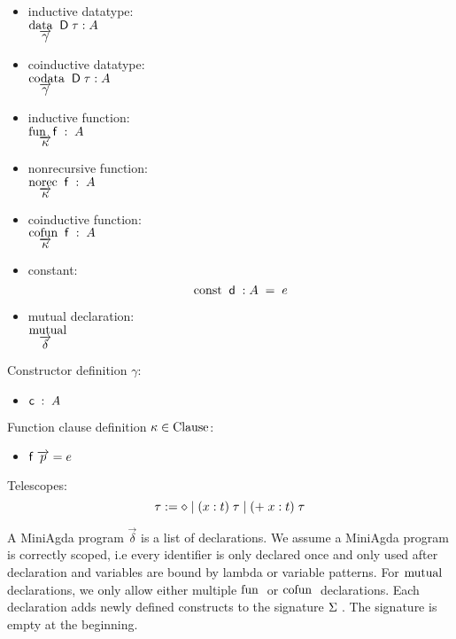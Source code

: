 \begin{itemize}
\item
inductive datatype:\\ 
$\mathrm{data}\; \; \mathsf{D} \; \tau : A $\\ 
$\hspace*{3mm} \overrightarrow{\gamma}$  
\item
coinductive datatype:\\
$\mathrm{codata}\; \; \mathsf{D} \; \tau : A $\\
$\hspace*{3mm} \overrightarrow{\gamma}$  
\item
inductive function:\\
$\mathrm{fun}\; \; \mathsf{f} \; : \; A$\\
$\hspace*{3mm} \overrightarrow{\kappa}$
\item
nonrecursive function:\\
$\mathrm{norec}\; \; \mathsf{f} \; : \; A $\\ 
$\hspace*{3mm} \overrightarrow{\kappa}$
\item
coinductive function:\\
$\mathrm{cofun}\; \; \mathsf{f} \; : \; A $\\
$\hspace*{3mm} \overrightarrow{\kappa}$
\item
constant:\\
\[\mathrm{const}\; \;  \mathsf{d} \; : A \; = \; e \]
\item
mutual declaration:\\
$\mathrm{mutual}\;$\\
$\hspace*{3mm} \overrightarrow{\delta}$
\end{itemize}
Constructor definition $\gamma$:
\begin{itemize}
\item
$ \mathsf{c} \; : \; A $ 
\end{itemize}
Function clause definition $\kappa \in \mathrm{Clause}$:
\begin{itemize}
\item
$\mathsf{f} \; \overrightarrow{p} = e$ 
\end{itemize}
Telescopes:
\[ \tau := \diamond \;\vert\; ( x : t ) \; \tau \;\vert\; ( + \; x : t ) \; \tau \]

A MiniAgda program $\vec{\delta}$ is a list of declarations.
We assume a MiniAgda program is correctly scoped, i.e every identifier
is only declared once and only used after declaration and variables are bound by lambda or variable patterns.
For $\mathrm{mutual}\;$ declarations, we only allow either multiple $\mathrm{fun}\;$ or $\mathrm{cofun}\;$ declarations.
Each declaration adds newly defined constructs to the signature $\Sigma\;$.
The signature is empty at the beginning.

